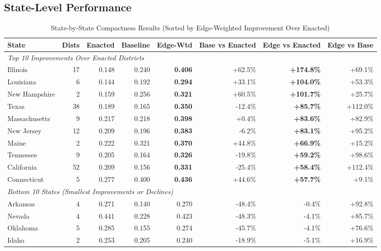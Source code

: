 \subsection{State-Level Performance}

\begin{table}[t]
\centering
\caption{State-by-State Compactness Results (Sorted by Edge-Weighted Improvement Over Enacted)}
\small
\begin{tabular}{lrrrrrrr}
\toprule
\textbf{State} & \textbf{Dists} & \textbf{Enacted} & \textbf{Baseline} & \textbf{Edge-Wtd} & \textbf{Base vs Enacted} & \textbf{Edge vs Enacted} & \textbf{Edge vs Base} \\
\midrule
\multicolumn{8}{l}{\textit{Top 10 Improvements Over Enacted Districts}} \\
Illinois & 17 & 0.148 & 0.240 & \textbf{0.406} & +62.5\% & \textbf{+174.8\%} & +69.1\% \\
Louisiana & 6 & 0.144 & 0.192 & \textbf{0.294} & +33.1\% & \textbf{+104.0\%} & +53.3\% \\
New Hampshire & 2 & 0.159 & 0.256 & \textbf{0.321} & +60.5\% & \textbf{+101.7\%} & +25.7\% \\
Texas & 38 & 0.189 & 0.165 & \textbf{0.350} & -12.4\% & \textbf{+85.7\%} & +112.0\% \\
Massachusetts & 9 & 0.217 & 0.218 & \textbf{0.398} & +0.4\% & \textbf{+83.6\%} & +82.9\% \\
New Jersey & 12 & 0.209 & 0.196 & \textbf{0.383} & -6.2\% & \textbf{+83.1\%} & +95.2\% \\
Maine & 2 & 0.222 & 0.321 & \textbf{0.370} & +44.8\% & \textbf{+66.9\%} & +15.2\% \\
Tennessee & 9 & 0.205 & 0.164 & \textbf{0.326} & -19.8\% & \textbf{+59.2\%} & +98.6\% \\
California & 52 & 0.209 & 0.156 & \textbf{0.331} & -25.4\% & \textbf{+58.4\%} & +112.4\% \\
Connecticut & 5 & 0.277 & 0.400 & \textbf{0.436} & +44.6\% & \textbf{+57.7\%} & +9.1\% \\
\midrule
\multicolumn{8}{l}{\textit{Bottom 10 States (Smallest Improvements or Declines)}} \\
Arkansas & 4 & 0.271 & 0.140 & 0.270 & -48.4\% & -0.4\% & +92.8\% \\
Nevada & 4 & 0.441 & 0.228 & 0.423 & -48.3\% & -4.1\% & +85.7\% \\
Oklahoma & 5 & 0.285 & 0.155 & 0.274 & -45.7\% & -4.1\% & +76.6\% \\
Idaho & 2 & 0.253 & 0.205 & 0.240 & -18.9\% & -5.1\% & +16.9\% \\

\end{tabular}
\end{table}
